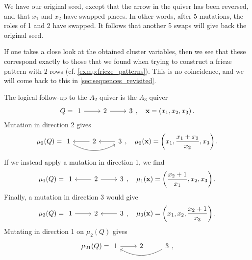 \begin{example}
	We have our original seed, except that the arrow in the quiver has been reversed, and
	that $x_1$ and $x_2$ have swapped places. In other words, after 5 mutations, the roles
	of 1 and 2 have swapped. It follows that another 5 swaps will give back the original
	seed.

	If one takes a close look at the obtained cluster variables, then we see that these
	correspond exactly to those that we found when trying to construct a frieze pattern
	with 2 rows (cf. \cref{exmp:frieze_patterns}). This is no coincidence, and we will come
	back to this in \cref{sec:sequences_revisited}.
\end{example}

\begin{example}\label{exmp:A3_quiver}
	The logical follow-up to the $A_2$ quiver is the $A_3$ quiver
	\begin{equation*}
		Q =
		\begin{tikzcd}
			1 \rar[] & 2 \rar[] &3
		\end{tikzcd},
		\quad \bx = \left(x_1, x_2, x_3\right).
	\end{equation*}
	Mutation in direction 2 gives
	\begin{equation*}
		\mu_2(Q) =
		\begin{tikzcd}
			1 \rar[leftarrow] \ar[rr, bend right] & 2 \rar[leftarrow]& 3
		\end{tikzcd},
		\quad \mu_2(\bx) = \left(x_1, \frac{x_1 + x_3}{x_2}, x_3\right).
	\end{equation*}
	If we instead apply a mutation in direction 1, we find
	\begin{equation*}
		\mu_1(Q) =
		\begin{tikzcd}
			1 \rar[leftarrow] & 2 \rar[]& 3
		\end{tikzcd},
		\quad \mu_1(\bx) = \left(\frac{x_2 + 1}{x_1}, x_2, x_3\right).
	\end{equation*}
	Finally, a mutation in direction 3 would give
	\begin{equation*}
		\mu_3(Q) =
		\begin{tikzcd}
			1 \rar[] & 2 \rar[leftarrow]& 3
		\end{tikzcd},
		\quad \mu_3(\bx) = \left(x_1, x_2, \frac{x_2 + 1}{x_3}\right).
	\end{equation*}
	Mutating in direction 1 on $\mu_2(Q)$ gives
	\begin{equation*}
		\mu_{21}(Q) =
		\begin{tikzcd}
			1 \rar[] \ar[rr,leftarrow, bend right] & 2 & 3
		\end{tikzcd},

\end{equation*}
\end{example}
